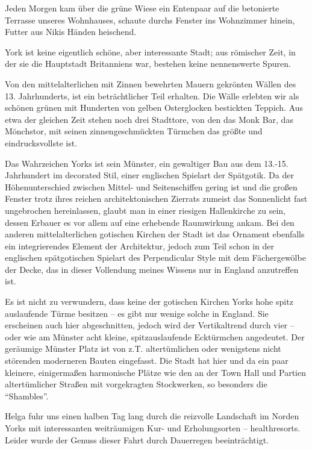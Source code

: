\documentclass[a5paper,pagesize,10pt,twoside=true]{scrbook}
\begin{document}
Jeden Morgen kam über die grüne Wiese ein Entenpaar auf die betonierte Terrasse unseres Wohnhauses, schaute durchs Fenster ins Wohnzimmer hinein, Futter aus Nikis Händen heischend.

York ist keine eigentlich schöne, aber interessante Stadt; aus römischer Zeit, in der sie die Hauptstadt Britanniens war, bestehen keine nennenswerte Spuren.

Von den mittelalterlichen mit Zinnen bewehrten Mauern gekrönten Wällen des 13. Jahrhunderts, ist ein beträchtlicher Teil erhalten. Die Wälle erlebten wir als schönen grünen mit Hunderten von gelben Osterglocken bestickten Teppich. Aus etwa der gleichen Zeit stehen noch drei Stadttore, von den das Monk Bar, das Mönchstor, mit seinen zinnengeschmückten Türmchen das größte und eindrucksvollste ist.

Das Wahrzeichen Yorks ist sein Münster, ein gewaltiger Bau aus dem 13.-15. Jahrhundert im decorated Stil, einer englischen Spielart der Spätgotik. Da der Höhenunterschied zwischen Mittel- und Seitenschiffen gering ist und die großen Fenster trotz ihres reichen architektonischen Zierrats zumeist das Sonnenlicht fast ungebrochen hereinlassen, glaubt man in einer riesigen Hallenkirche zu sein, dessen Erbauer es vor allem auf eine erhebende Raumwirkung ankam. Bei den anderen mittelalterlichen gotischen Kirchen der Stadt ist das Ornament ebenfalls ein integrierendes Element der Architektur, jedoch zum Teil schon in der englischen spätgotischen Spielart des Perpendicular Style mit dem Fächergewölbe der Decke, das in dieser Vollendung meines Wissens nur in England anzutreffen ist.

Es ist nicht zu verwundern, dass keine der gotischen Kirchen Yorks hohe spitz auslaufende Türme besitzen -- es gibt nur wenige solche in England. Sie erscheinen auch hier abgeschnitten, jedoch wird der Vertikaltrend durch vier -- oder wie am Münster acht kleine, spitzauslaufende Ecktürmchen angedeutet. Der geräumige Münster Platz ist von z.T. altertümlichen oder wenigstens nicht störenden moderneren Bauten eingefasst. Die Stadt hat hier und da ein paar kleinere, einigermaßen harmonische Plätze wie den an der Town Hall und Partien altertümlicher Straßen mit vorgekragten Stockwerken, so besonders die \enquote{Shambles}.

Helga fuhr uns einen halben Tag lang durch die reizvolle Landschaft im Norden Yorks mit interessanten weiträumigen Kur- und Erholungsorten -- healthresorts. Leider wurde der Genuss dieser Fahrt durch Dauerregen beeinträchtigt.
\end{document}
